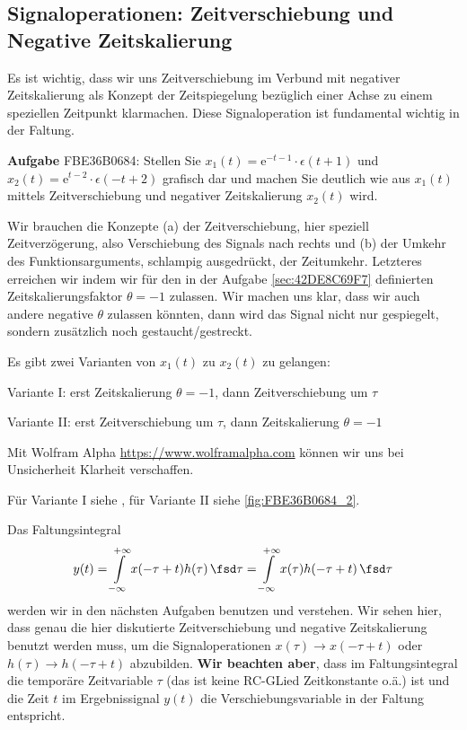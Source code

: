 \subsection{Signaloperationen: Zeitverschiebung und Negative Zeitskalierung}
\label{sec:FBE36B0684}
\begin{Ziel}
Es ist wichtig, dass wir uns Zeitverschiebung im Verbund mit negativer Zeitskalierung
als Konzept der Zeitspiegelung bezüglich einer Achse zu einem speziellen Zeitpunkt
klarmachen. Diese Signaloperation ist fundamental wichtig in der Faltung.
\end{Ziel}
\textbf{Aufgabe} {\tiny FBE36B0684}: Stellen Sie
$x_1(t) = \mathrm{e}^{-t-1} \cdot \epsilon(t+1)$ und
$x_2(t) = \mathrm{e}^{t-2} \cdot \epsilon(-t+2)$
grafisch dar und machen Sie deutlich wie aus $x_1(t)$  mittels Zeitverschiebung
und negativer Zeitskalierung $x_2(t)$ wird.
\begin{Werkzeug}
Wir brauchen die Konzepte (a) der Zeitverschiebung, hier speziell Zeitverzögerung,
also Verschiebung des Signals nach rechts und (b) der Umkehr des Funktionsarguments,
schlampig ausgedrückt, der Zeitumkehr. Letzteres erreichen wir indem wir
für den in der Aufgabe \ref{sec:42DE8C69F7} definierten Zeitskalierungsfaktor
$\theta=-1$ zulassen. Wir machen uns klar, dass wir auch andere negative
$\theta$ zulassen könnten, dann wird das Signal nicht nur gespiegelt,
sondern zusätzlich noch gestaucht/gestreckt.
\end{Werkzeug}
\begin{Ansatz}
Es gibt zwei Varianten von $x_1(t)$ zu $x_2(t)$ zu gelangen:

Variante I: erst Zeitskalierung $\theta=-1$, dann Zeitverschiebung um $\tau$

Variante II: erst Zeitverschiebung um $\tau$, dann Zeitskalierung $\theta=-1$

\end{Ansatz}
\begin{ExCalc}
Mit Wolfram Alpha \url{https://www.wolframalpha.com} können wir uns bei
Unsicherheit Klarheit verschaffen.
\end{ExCalc}
\begin{Loesung}
Für Variante I siehe , für Variante II siehe
\ref{fig:FBE36B0684_2}.

Das Faltungsintegral
\begin{equation}
y(t)
= \int\limits_{-\infty}^{+\infty} x(-\tau+t) h(\tau) \, \fsd \tau
= \int\limits_{-\infty}^{+\infty} x(\tau) h(-\tau+t) \, \fsd \tau
\end{equation}
werden wir in den nächsten Aufgaben benutzen und verstehen.
%
Wir sehen hier, dass genau die hier
diskutierte Zeitverschiebung und negative Zeitskalierung benutzt werden muss, um
die Signaloperationen $x(\tau) \rightarrow x(-\tau+t)$
oder $h(\tau) \rightarrow h(-\tau+t)$ abzubilden.
\textbf{Wir beachten aber}, dass im Faltungsintegral die temporäre Zeitvariable
$\tau$ (das ist keine RC-GLied Zeitkonstante o.ä.) ist und die Zeit $t$
im Ergebnissignal $y(t)$ die Verschiebungsvariable in der Faltung entspricht.
\end{Loesung}

